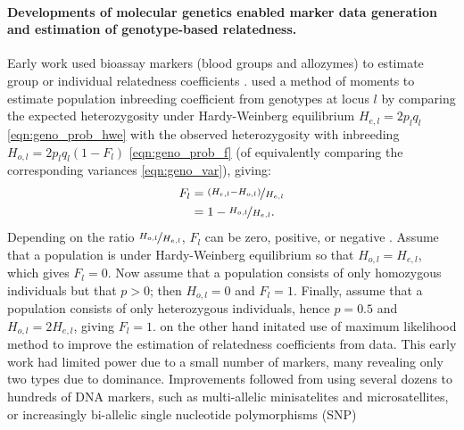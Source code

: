 \paragraph{Developments of molecular genetics enabled marker data
generation and estimation of genotype-based relatedness.}
%
Early work used bioassay markers (blood groups and allozymes)
to estimate group or individual relatedness coefficients
\citep[e.g.][]{li1953some, morton1971bioassay, thompson1975estimation, pamilo1982measuring, queller1989estimating}.
%
\cite{li1953some} used a method of moments to estimate population
inbreeding coefficient from genotypes at locus $l$ by comparing
the expected heterozygosity under Hardy-Weinberg equilibrium $H_{e,l} = 2 p_l q_l$ \eqref{eqn:geno_prob_hwe} with
the observed heterozygosity with inbreeding $H_{o,l} = 2 p_l q_l (1 - F_l)$ \eqref{eqn:geno_prob_f}
(of equivalently comparing the corresponding variances \eqref{eqn:geno_var}),
giving:
%
\begin{align} \label{eqn:LiHorvitz_f}
  F_l & = \nicefrac{\left(H_{e,l} - H_{o,l}\right)}{H_{e,l}}\\
      & = 1 - \nicefrac{H_{o,l}}{H_{e,l}}. \notag
\end{align}
%
%
Depending on the ratio $\nicefrac{H_{o,l}}{H_{e,l}}$, $F_l$ can be zero,
positive, or negative \citep{wright1921systems, wright1922coefficients, wright1949genetical, li1953some}.
%
Assume that a population is under Hardy-Weinberg equilibrium so that
$H_{o,l} = H_{e,l}$, which gives $F_l = 0$.
%
Now assume that a population consists of only homozygous individuals but
that $p > 0$; then $H_{o,l} = 0$ and $F_l = 1$.
%
Finally, assume that a population consists of only heterozygous individuals,
hence $p = 0.5$ and $H_{o,l} = 2H_{e,l}$, giving $F_l = 1$.
%
\cite{thompson1975estimation} on the other hand initated use of maximum
likelihood method to improve the estimation of relatedness coefficients
from data.
%
This early work had limited power due to a small number of markers, many
revealing only two types due to dominance.
%
Improvements followed from using several dozens to hundreds of DNA markers,
such as multi-allelic minisatelites and microsatellites, or
increasingly bi-allelic single nucleotide polymorphisms (SNP)
